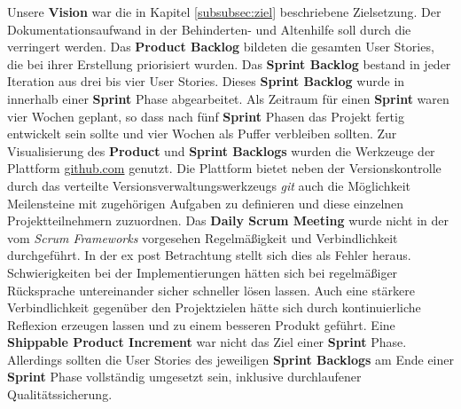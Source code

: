 Unsere \textbf{Vision} war die in Kapitel \ref{subsubsec:ziel} beschriebene Zielsetzung. Der Dokumentationsaufwand in der Behinderten- und Altenhilfe
soll durch die \EBP verringert werden. Das \textbf{Product Backlog} bildeten die gesamten User Stories, die bei ihrer Erstellung priorisiert wurden.
Das \textbf{Sprint Backlog} bestand in jeder Iteration aus drei bis vier User Stories. Dieses \textbf{Sprint Backlog} wurde in innerhalb einer
\textbf{Sprint} Phase abgearbeitet. Als Zeitraum für einen \textbf{Sprint} waren vier Wochen geplant, so dass nach fünf \textbf{Sprint} Phasen das
Projekt fertig entwickelt sein sollte und vier Wochen als Puffer verbleiben sollten. Zur Visualisierung des \textbf{Product} und \textbf{Sprint
Backlogs} wurden die Werkzeuge der Plattform \url{github.com} genutzt. Die Plattform bietet neben der Versionskontrolle durch das verteilte
Versionsverwaltungswerkzeugs \textit{git} auch die Möglichkeit Meilensteine mit zugehörigen Aufgaben zu definieren und diese einzelnen
Projektteilnehmern zuzuordnen. Das \textbf{Daily Scrum Meeting} wurde nicht in der vom \textit{Scrum Frameworks} vorgesehen Regelmäßigkeit und
Verbindlichkeit durchgeführt. In der ex post Betrachtung stellt sich dies als Fehler heraus. Schwierigkeiten bei der Implementierungen hätten sich
bei regelmäßiger Rücksprache untereinander sicher schneller lösen lassen. Auch eine stärkere Verbindlichkeit gegenüber den Projektzielen hätte sich
durch kontinuierliche Reflexion erzeugen lassen und zu einem besseren Produkt geführt. Eine \textbf{Shippable Product Increment} war nicht das Ziel
einer \textbf{Sprint} Phase. Allerdings sollten die User Stories des jeweiligen \textbf{Sprint Backlogs} am Ende einer \textbf{Sprint} Phase
vollständig umgesetzt sein, inklusive durchlaufener Qualitätssicherung.  
